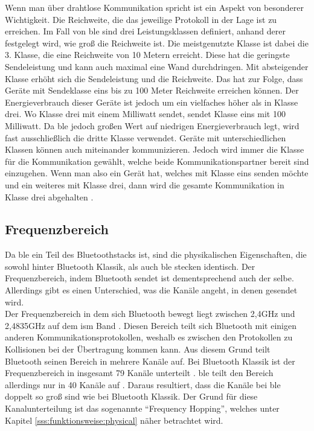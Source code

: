 \noindent Wenn man über drahtlose Kommunikation spricht ist ein Aspekt von besonderer Wichtigkeit. Die Reichweite, die das jeweilige Protokoll in der Lage ist zu erreichen. Im Fall von \ac{ble} sind drei Leistungsklassen definiert, anhand derer festgelegt wird, wie groß die Reichweite ist. Die meistgenutzte Klasse ist dabei die 3. Klasse, die eine Reichweite von 10 Metern erreicht. Diese hat die geringste Sendeleistung und kann auch maximal eine Wand durchdringen. Mit absteigender Klasse erhöht sich die Sendeleistung und die Reichweite. Das hat zur Folge, dass Geräte mit Sendeklasse eins bis zu 100 Meter Reichweite erreichen können. Der Energieverbrauch dieser Geräte ist jedoch um ein vielfaches höher als in Klasse drei. Wo Klasse drei mit einem Milliwatt sendet, sendet Klasse eins mit 100 Milliwatt. Da \ac{ble} jedoch großen Wert auf niedrigen Energieverbrauch legt, wird fast ausschließlich die dritte Klasse verwendet. Geräte mit unterschiedlichen Klassen können auch miteinander kommunizieren. Jedoch wird immer die Klasse für die Kommunikation gewählt, welche beide Kommunikationspartner bereit sind einzugehen. Wenn man also ein Gerät hat, welches mit Klasse eins senden möchte und ein weiteres mit Klasse drei, dann wird die gesamte Kommunikation in Klasse drei abgehalten \cite[Seite 411]{Sauter18:GMK}.\\ 

\subsection{Frequenzbereich}
\label{ss:grundlagen:frequenz}

Da \ac{ble} ein Teil des Bluetoothstacks ist, sind die physikalischen Eigenschaften, die sowohl hinter Bluetooth Klassik, als auch \ac{ble} stecken identisch. Der Frequenzbereich, indem Bluetooth sendet ist dementsprechend auch der selbe. Allerdings gibt es einen Unterschied, was die Kanäle angeht, in denen gesendet wird.\\

\noindent Der Frequenzbereich in dem sich Bluetooth bewegt liegt zwischen 2,4GHz und 2,4835GHz auf dem \ac{ism} Band \cite[Seite 16]{Townsend14:GSB}. Diesen Bereich teilt sich Bluetooth mit einigen anderen Kommunikationsprotokollen, weshalb es zwischen den Protokollen zu Kollisionen bei der Übertragung kommen kann. Aus diesem Grund teilt Bluetooth seinen Bereich in mehrere Kanäle auf. Bei Bluetooth Klassik ist der Frequenzbereich in insgesamt 79 Kanäle unterteilt \cite[Seite 410]{Sauter18:GMK}. \ac{ble} teilt den Bereich allerdings nur in 40 Kanäle auf \cite[Seite 16]{Townsend14:GSB}. Daraus resultiert, dass die Kanäle bei \ac{ble} doppelt so groß sind wie bei Bluetooth Klassik. Der Grund für diese Kanalunterteilung ist das sogenannte "`Frequency Hopping"', welches unter Kapitel \ref{sss:funktionsweise:physical} näher betrachtet wird.\\  

